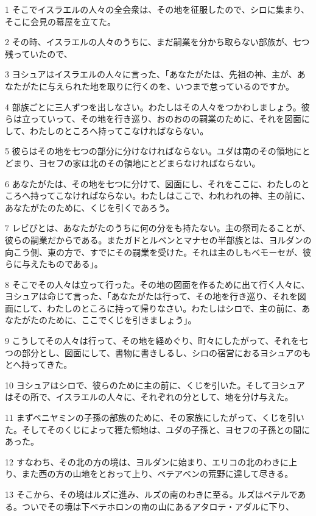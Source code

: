 \par 1 そこでイスラエルの人々の全会衆は、その地を征服したので、シロに集まり、そこに会見の幕屋を立てた。
\par 2 その時、イスラエルの人々のうちに、まだ嗣業を分かち取らない部族が、七つ残っていたので、
\par 3 ヨシュアはイスラエルの人々に言った、「あなたがたは、先祖の神、主が、あなたがたに与えられた地を取りに行くのを、いつまで怠っているのですか。
\par 4 部族ごとに三人ずつを出しなさい。わたしはその人々をつかわしましょう。彼らは立っていって、その地を行き巡り、おのおのの嗣業のために、それを図面にして、わたしのところへ持ってこなければならない。
\par 5 彼らはその地を七つの部分に分けなければならない。ユダは南のその領地にとどまり、ヨセフの家は北のその領地にとどまらなければならない。
\par 6 あなたがたは、その地を七つに分けて、図面にし、それをここに、わたしのところへ持ってこなければならない。わたしはここで、われわれの神、主の前に、あなたがたのために、くじを引くであろう。
\par 7 レビびとは、あなたがたのうちに何の分をも持たない。主の祭司たることが、彼らの嗣業だからである。またガドとルベンとマナセの半部族とは、ヨルダンの向こう側、東の方で、すでにその嗣業を受けた。それは主のしもべモーセが、彼らに与えたものである」。
\par 8 そこでその人々は立って行った。その地の図面を作るために出て行く人々に、ヨシュアは命じて言った、「あなたがたは行って、その地を行き巡り、それを図面にして、わたしのところに持って帰りなさい。わたしはシロで、主の前に、あなたがたのために、ここでくじを引きましょう」。
\par 9 こうしてその人々は行って、その地を経めぐり、町々にしたがって、それを七つの部分とし、図面にして、書物に書きしるし、シロの宿営におるヨシュアのもとへ持ってきた。
\par 10 ヨシュアはシロで、彼らのために主の前に、くじを引いた。そしてヨシュアはその所で、イスラエルの人々に、それぞれの分として、地を分け与えた。
\par 11 まずベニヤミンの子孫の部族のために、その家族にしたがって、くじを引いた。そしてそのくじによって獲た領地は、ユダの子孫と、ヨセフの子孫との間にあった。
\par 12 すなわち、その北の方の境は、ヨルダンに始まり、エリコの北のわきに上り、また西の方の山地をとおって上り、ベテアベンの荒野に達して尽きる。
\par 13 そこから、その境はルズに進み、ルズの南のわきに至る。ルズはベテルである。ついでその境は下ベテホロンの南の山にあるアタロテ・アダルに下り、
